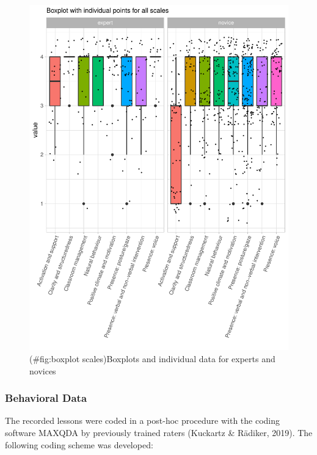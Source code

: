 \documentclass[
  english,
  man,floatsintext]{apa6}
\begin{document}
\begin{figure}
\centering
\includegraphics{paper_1_supplement_new_table_files/figure-latex/boxplot scales-1.pdf}
\caption{(\#fig:boxplot scales)Boxplots and individual data for experts and novices}
\end{figure}

\newpage

\hypertarget{behavioral-data-1}{%
\subsubsection{Behavioral Data}\label{behavioral-data-1}}

The recorded lessons were coded in a post-hoc procedure with the coding software MAXQDA by previously trained raters (Kuckartz \& Rädiker, 2019). The following coding scheme was developed:
\end{document}
